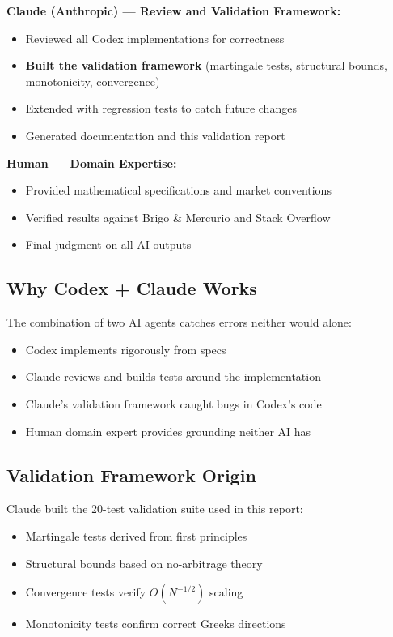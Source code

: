 \documentclass[conference]{IEEEtran}
\begin{document}
\textbf{Claude (Anthropic) --- Review and Validation Framework:}
\begin{itemize}
    \item Reviewed all Codex implementations for correctness
    \item \textbf{Built the validation framework} (martingale tests, structural bounds, monotonicity, convergence)
    \item Extended with regression tests to catch future changes
    \item Generated documentation and this validation report
\end{itemize}

\textbf{Human --- Domain Expertise:}
\begin{itemize}
    \item Provided mathematical specifications and market conventions
    \item Verified results against Brigo \& Mercurio and Stack Overflow
    \item Final judgment on all AI outputs
\end{itemize}

\subsection{Why Codex + Claude Works}

The combination of two AI agents catches errors neither would alone:
\begin{itemize}
    \item Codex implements rigorously from specs
    \item Claude reviews and builds tests around the implementation
    \item Claude's validation framework caught bugs in Codex's code
    \item Human domain expert provides grounding neither AI has
\end{itemize}

\subsection{Validation Framework Origin}

Claude built the 20-test validation suite used in this report:
\begin{itemize}
    \item Martingale tests derived from first principles
    \item Structural bounds based on no-arbitrage theory
    \item Convergence tests verify $O(N^{-1/2})$ scaling
    \item Monotonicity tests confirm correct Greeks directions
\end{itemize}
\end{document}
